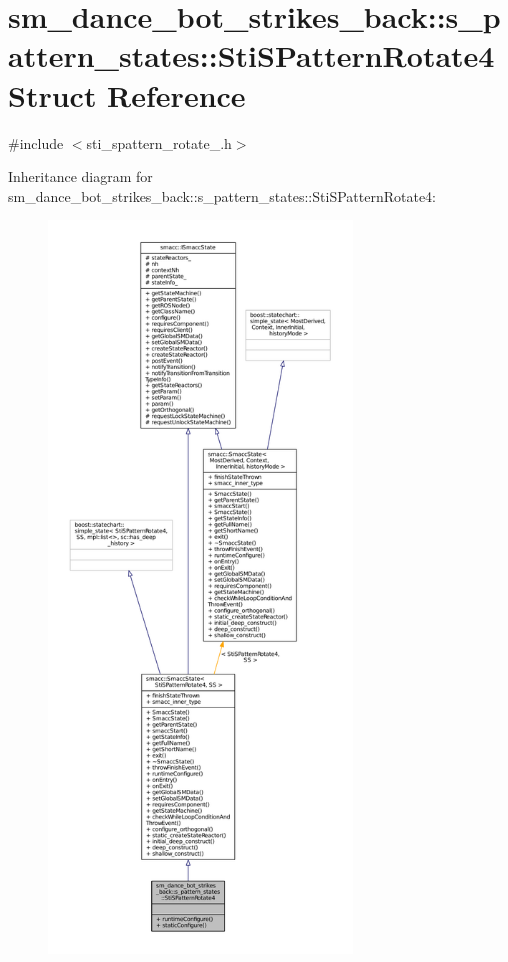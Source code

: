\hypertarget{structsm__dance__bot__strikes__back_1_1s__pattern__states_1_1StiSPatternRotate4}{}\section{sm\+\_\+dance\+\_\+bot\+\_\+strikes\+\_\+back\+:\+:s\+\_\+pattern\+\_\+states\+:\+:Sti\+S\+Pattern\+Rotate4 Struct Reference}
\label{structsm__dance__bot__strikes__back_1_1s__pattern__states_1_1StiSPatternRotate4}


{\ttfamily \#include $<$sti\+\_\+spattern\+\_\+rotate\+\_.\+h$>$}



Inheritance diagram for sm\+\_\+dance\+\_\+bot\+\_\+strikes\+\_\+back\+:\+:s\+\_\+pattern\+\_\+states\+:\+:Sti\+S\+Pattern\+Rotate4\+:
\nopagebreak
\begin{figure}[H]
\begin{center}
\leavevmode
\includegraphics[height=550pt]{structsm__dance__bot__strikes__back_1_1s__pattern__states_1_1StiSPatternRotate4__inherit__graph}
\end{center}
\end{figure}


